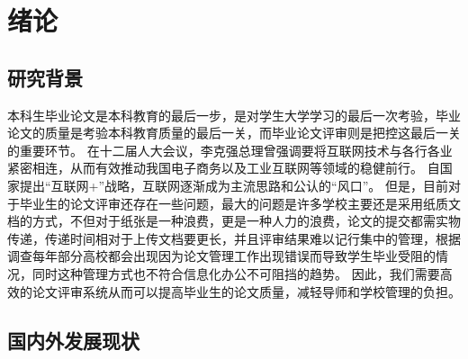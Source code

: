 
\chapter{绪论}
\label{chap02}
\section{研究背景}

本科生毕业论文是本科教育的最后一步，是对学生大学学习的最后一次考验，毕业论文的质量是考验本科教育质量的最后一关\cite{.2019}，而毕业论文评审则是把控这最后一关的重要环节。
在十二届人大会议，李克强总理曾强调要将互联网技术与各行各业紧密相连，从而有效推动我国电子商务以及工业互联网等领域的稳健前行\cite{.2020c}。
自国家提出“互联网+”战略，互联网逐渐成为主流思路和公认的“风口”\cite{.20183}。 
但是，目前对于毕业生的论文评审还存在一些问题，最大的问题是许多学校主要还是采用纸质文档的方式，不但对于纸张是一种浪费，更是一种人力的浪费，论文的提交都需实物传递，传递时间相对于上传文档要更长，并且评审结果难以记行集中的管理\cite{.2017e}，根据调查每年部分高校都会出现因为论文管理工作出现错误而导致学生毕业受阻的情况\cite{.2018}，同时这种管理方式也不符合信息化办公不可阻挡的趋势。
因此，我们需要高效的论文评审系统从而可以提高毕业生的论文质量，减轻导师和学校管理的负担\cite{.2019d}。


\section{国内外发展现状}

